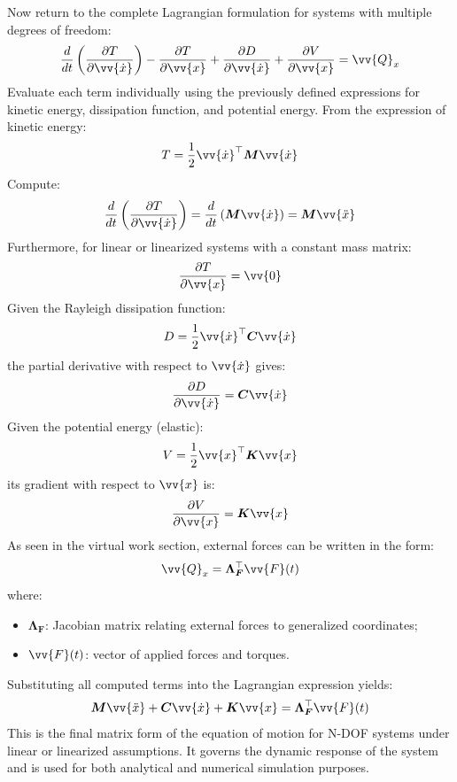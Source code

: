 Now return to the complete Lagrangian formulation for systems with multiple degrees of freedom:
\[
\frac{d}{dt} \left( \frac{\partial T}{\partial \vv{\dot{x}}} \right)
- \frac{\partial T}{\partial \vv{x}} 
+ \frac{\partial D}{\partial \vv{\dot{x}}}
+ \frac{\partial V}{\partial \vv{x}} = \vv{Q}_x
\]
Evaluate each term individually using the previously defined expressions for kinetic energy, dissipation function, and potential energy. From the expression of kinetic energy:
\[
T = \frac{1}{2} \vv{\dot{x}}^\top \boldsymbol{M}  \vv{\dot{x}}
\]
Compute:
\[
\frac{d}{dt} \left( \frac{\partial T}{\partial \vv{\dot{x}}} \right)
= \frac{d}{dt} \left( \boldsymbol{M}  \vv{\dot{x}} \right)
= \boldsymbol{M}  \vv{\ddot{x}}
\]
Furthermore, for linear or linearized systems with a constant mass matrix:
\[
\frac{\partial T}{\partial \vv{x}} = \vv{0}
\]
Given the Rayleigh dissipation function:
\[
D = \frac{1}{2} \vv{\dot{x}}^\top  \boldsymbol{C}  \vv{\dot{x}}
\]
the partial derivative with respect to \( \vv{\dot{x}} \) gives:
\[
\frac{\partial D}{\partial \vv{\dot{x}}} = \boldsymbol{C}  \vv{\dot{x}}
\]
Given the potential energy (elastic):
\[
V = \frac{1}{2} \vv{x}^\top  \boldsymbol{K}  \vv{x}
\]
its gradient with respect to \( \vv{x} \) is:
\[
\frac{\partial V}{\partial \vv{x}} = \boldsymbol{K}  \vv{x}
\]
As seen in the virtual work section, external forces can be written in the form:
\[
\vv{Q}_x = \boldsymbol{\Lambda_F}^\top  \vv{F}(t)
\]
where:

\begin{itemize}
    \item \( \boldsymbol{\Lambda_F} \): Jacobian matrix relating external forces to generalized coordinates;
    \item \( \vv{F}(t) \): vector of applied forces and torques.
\end{itemize}

Substituting all computed terms into the Lagrangian expression yields:
\[
\boldsymbol{M}  \vv{\ddot{x}} 
+ \boldsymbol{C}  \vv{\dot{x}} 
+ \boldsymbol{K}  \vv{x} 
= \boldsymbol{\Lambda_F}^\top  \vv{F}(t)
\]
This is the final matrix form of the equation of motion for N-DOF systems under linear or linearized assumptions. It governs the dynamic response of the system and is used for both analytical and numerical simulation purposes.
